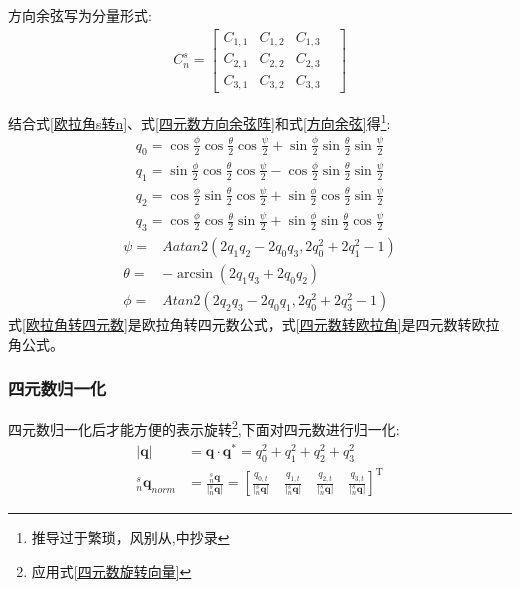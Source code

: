 方向余弦写为分量形式:
\begin{equation}\label{方向余弦}
    \begin{split} 
        C^s_n = \left[\begin{matrix} 
                C_{1,1} & C_{1,2} & C_{1,3} & \\
                C_{2,1} & C_{2,2} & C_{2,3} & \\
                C_{3,1} & C_{3,2} & C_{3,3} &
        \end{matrix}\right]
    \end{split}
\end{equation} 

结合式\ref{欧拉角s转n}、式\ref{四元数方向余弦阵}和式\ref{方向余弦}得\footnote{推导过于繁琐，风别从\citep{捷联惯导航},\citep{9轴融合论文}中抄录}:
\begin{equation}\label{欧拉角转四元数}
    \begin{split} 
        q_0=\cos\frac{\phi}{2}\cos\frac{\theta}{2}\cos\frac{\psi}{2}+\sin\frac{\phi}{2}\sin\frac{\theta}{2}\sin\frac{\psi}{2} \\
        q_1=\sin\frac{\phi}{2}\cos\frac{\theta}{2}\cos\frac{\psi}{2}-\cos\frac{\phi}{2}\sin\frac{\theta}{2}\sin\frac{\psi}{2} \\
        q_2=\cos\frac{\phi}{2}\sin\frac{\theta}{2}\cos\frac{\psi}{2}+\sin\frac{\phi}{2}\cos\frac{\theta}{2}\sin\frac{\psi}{2} \\
        q_3=\cos\frac{\phi}{2}\cos\frac{\theta}{2}\sin\frac{\psi}{2}+\sin\frac{\phi}{2}\sin\frac{\theta}{2}\cos\frac{\psi}{2}
    \end{split}
\end{equation} 
\begin{equation}\label{四元数转欧拉角}
    \begin{split} 
        \psi=&Aatan2(2q_1q_2-2q_0q_3,2q^2_0+2q^2_1-1) \\
        \theta=&-\arcsin(2q_1q_3+2q_0q_2) \\
        \phi=&Atan2(2q_2q_3-2q_0q_1,2q^2_0+2q^2_3-1)
    \end{split}
\end{equation} 
式\ref{欧拉角转四元数}是欧拉角转四元数公式，式\ref{四元数转欧拉角}是四元数转欧拉角公式。

\subsubsection{四元数归一化}
四元数归一化\citep{四元数矢量旋转证明1,四元数矢量旋转证明2}后才能方便的表示旋转\footnote{应用式\ref{四元数旋转向量}},下面对四元数进行归一化:
\begin{equation}\label{四元数归一化}
    \begin{split}
        |\bm{q}|&=\bm{q} \cdot \bm{q}^*={q_0^2+q_1^2+q_2^2+q_3^2}\\ 
        ^s_n\bm{q}_{norm}&=\frac{^s_n\bm{q}}{|^s_n\bm{q}|}
        =\left[\frac{q_{0,t}}{|^s_n\bm{q}|}\quad
            \frac{q_{1,t}}{|^s_n\bm{q}|}\quad
            \frac{q_{2,t}}{|^s_n\bm{q}|}\quad
             \frac{q_{3,t}}{|^s_n\bm{q}|}\right]^\mathrm{T}
    \end{split}
\end{equation} 

